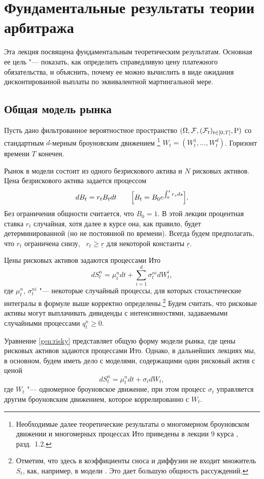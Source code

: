 
\chapter{Фундаментальные результаты теории арбитража}
\label{ch:general}
\chaptertoc

Эта лекция посвящена фундаментальным теоретическим результатам.
Основная ее цель "--- показать, как определить справедливую цену платежного обязательства, и объяснить, почему ее можно вычислить в виде ожидания дисконтированной выплаты по эквивалентной мартингальной мере.


\section{Общая модель рынка}

Пусть дано фильтрованное вероятностное пространство $(\Omega,\mathcal{F},(\mathcal{F}_t)_{t\in[0,T]},\mathrm{P})$ со стандартным $d$-мерным броуновским движением%
\footnote{Необходимые далее теоретические результаты о многомерном броуновском движении и многомерных процессах Ито приведены в лекции 9 курса \intro, разд.~1.2.}
$W_t=(W_t^1,\dots,W_t^d)$. 
Горизонт времени $T$ конечен.

Рынок в модели состоит из одного безрискового актива и $N$ рисковых активов.
Цена безрискового актива задается процессом
\[
d B_t = r_tB_t dt \qquad\Bigl[B_t = B_0 e^{\int_0^t r_s ds}\Bigr].
\] 
Без ограничения общности считается, что $B_0=1$.
В этой лекции процентная ставка $r_t$ случайная, хотя далее в курсе она, как правило, будет детерминированной (но не постоянной по времени).
Всегда будем предполагать, что $r_t$ ограничена снизу, \te\ $r_t\ge\underline r$ для некоторой константы $\underline r$.

Цены рисковых активов задаются процессами Ито
\begin{equation}
\label{gen:risky}
d S_t^n = \mu_t^n dt + \sum_{i=1}^d \sigma^{ni}_t d W_t^i,
\end{equation}
где $\mu_t^n$, $\sigma_t^{ni}$ "--- некоторые случайный процессы, для которых стохастические интегралы в формуле выше корректно определены.\footnote{Отметим, что здесь в коэффициенты сноса и диффузии не входит множитель $S_t$, как, например, в модели \bs.
Это дает большую общность рассуждений.}
Будем считать, что рисковые активы могут выплачивать дивиденды с интенсивностями, задаваемыми случайными процессами $q_t^n\ge0$.

\begin{remark}
Уравнение \eqref{gen:risky} представляет общую форму модели рынка, где цены рисковых активов задаются процессами Ито.
Однако, в дальнейших лекциях мы, в основном, будем иметь дело с моделями, содержащими один рисковый актив с ценой
\begin{equation}
\label{gen:risky-simple}
d S_t^n = \mu_t^n dt + \sigma_t d W_t,
\end{equation}
где $W_t$ "--- одномерное броуновское движение, при этом процесс $\sigma_t$ управляется другим броуновским движением, которое коррелированно с $W_t$.
\end{remark}

